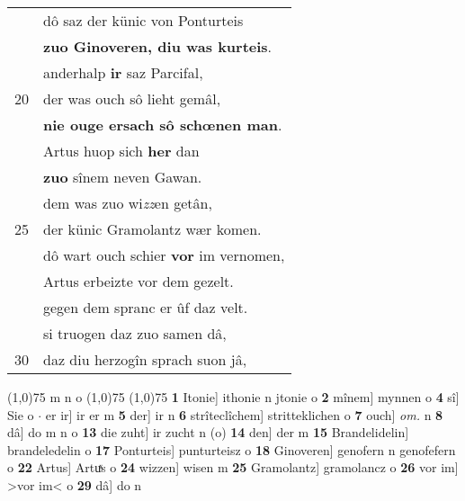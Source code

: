 \documentclass[8pt,a4paper,notitlepage]{article}
\begin{document}
\begin{table}[ht]
\begin{minipage}[t]{0.5\linewidth}
\begin{tabular}{rl}
 & dô saz der künic von Ponturteis\\ 
 & \textbf{zuo Ginoveren, diu was kurteis}.\\ 
 & anderhalp \textbf{ir} saz Parcifal,\\ 
20 & der was ouch sô lieht gemâl,\\ 
 & \textbf{nie ouge ersach sô schœnen man}.\\ 
 & Artus huop sich \textbf{her} dan\\ 
 & \textbf{zuo} sînem neven Gawan.\\ 
 & dem was zuo wi\textit{zz}en getân,\\ 
25 & der künic Gramolantz wær komen.\\ 
 & dô wart ouch schier \textbf{vor} im vernomen,\\ 
 & Artus erbeizte vor dem gezelt.\\ 
 & gegen dem spranc er ûf daz velt.\\ 
 & si truogen daz zuo samen dâ,\\ 
30 & daz diu herzogîn sprach suon jâ,\\ 
\end{tabular}
\scriptsize
\line(1,0){75} \newline
m n o \newline
\line(1,0){75} \newline
\newline
\line(1,0){75} \newline
\textbf{1} Itonie] ithonie n jtonie o \textbf{2} mînem] mynnen o \textbf{4} sî] Sie o  $\cdot$ er ir] ir er m \textbf{5} der] ir n \textbf{6} strîteclîchem] stritteklichen o \textbf{7} ouch] \textit{om.} n \textbf{8} dâ] do m n o \textbf{13} die zuht] ir zucht n (o) \textbf{14} den] der m \textbf{15} Brandelidelin] brandeledelin o \textbf{17} Ponturteis] punturteisz o \textbf{18} Ginoveren] genofern n genofefern o \textbf{22} Artus] Artuͯs o \textbf{24} wizzen] wisen m \textbf{25} Gramolantz] gramolancz o \textbf{26} vor im] >vor im< o \textbf{29} dâ] do n \newline
\end{minipage}
\end{table}
\newpage
\end{document}
